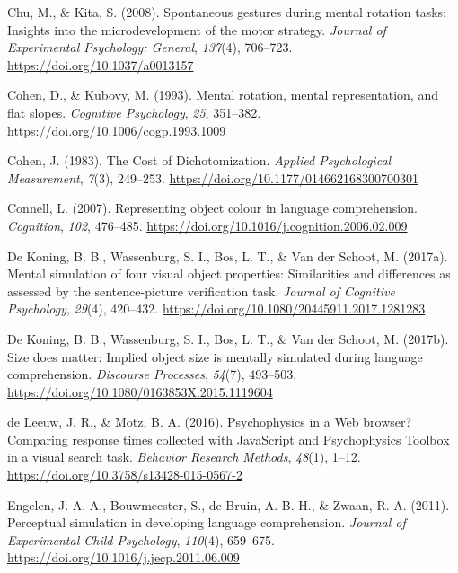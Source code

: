 \documentclass[
  man,floatsintext]{apa7}
\newlength{\cslhangindent}
\newlength{\cslentryspacingunit} %
\newenvironment{CSLReferences}[2] %
 {%
  \setlength{\parindent}{0pt}
  \ifodd #1
  \let\oldpar\par
  \def\par{\hangindent=\cslhangindent\oldpar}
  \fi
  \setlength{\parskip}{#2\cslentryspacingunit}
 }%
 {}
\begin{document}
\begin{CSLReferences}{1}{0}
\leavevmode{}%
Chu, M., \& Kita, S. (2008). Spontaneous gestures during mental rotation tasks: {Insights} into the microdevelopment of the motor strategy. \emph{Journal of Experimental Psychology: General}, \emph{137}(4), 706--723. \url{https://doi.org/10.1037/a0013157}

\leavevmode{}%
Cohen, D., \& Kubovy, M. (1993). Mental rotation, mental representation, and flat slopes. \emph{Cognitive Psychology}, \emph{25}, 351--382. \url{https://doi.org/10.1006/cogp.1993.1009}

\leavevmode{}%
Cohen, J. (1983). The Cost of Dichotomization. \emph{Applied Psychological Measurement}, \emph{7}(3), 249--253. \url{https://doi.org/10.1177/014662168300700301}

\leavevmode{}%
Connell, L. (2007). Representing object colour in language comprehension. \emph{Cognition}, \emph{102}, 476--485. \url{https://doi.org/10.1016/j.cognition.2006.02.009}

\leavevmode{}%
De Koning, B. B., Wassenburg, S. I., Bos, L. T., \& Van der Schoot, M. (2017a). Mental simulation of four visual object properties: Similarities and differences as assessed by the sentence-picture verification task. \emph{Journal of Cognitive Psychology}, \emph{29}(4), 420--432. \url{https://doi.org/10.1080/20445911.2017.1281283}

\leavevmode{}%
De Koning, B. B., Wassenburg, S. I., Bos, L. T., \& Van der Schoot, M. (2017b). Size does matter: {Implied} object size is mentally simulated during language comprehension. \emph{Discourse Processes}, \emph{54}(7), 493--503. \url{https://doi.org/10.1080/0163853X.2015.1119604}

\leavevmode{}%
de Leeuw, J. R., \& Motz, B. A. (2016). Psychophysics in a {Web} browser? {Comparing} response times collected with {JavaScript} and {Psychophysics Toolbox} in a visual search task. \emph{Behavior Research Methods}, \emph{48}(1), 1--12. \url{https://doi.org/10.3758/s13428-015-0567-2}

\leavevmode{}%
Engelen, J. A. A., Bouwmeester, S., de Bruin, A. B. H., \& Zwaan, R. A. (2011). Perceptual simulation in developing language comprehension. \emph{Journal of Experimental Child Psychology}, \emph{110}(4), 659--675. \url{https://doi.org/10.1016/j.jecp.2011.06.009}


\end{CSLReferences}
\end{document}
